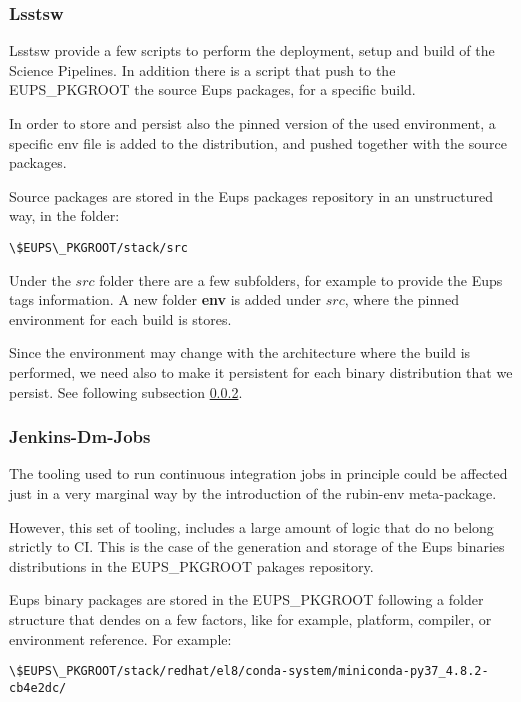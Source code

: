 \documentclass[DM,authoryear,toc]{lsstdoc}
\begin{document}
\subsubsection{Lsstsw} \label{sec:lsstsw}

Lsstsw provide a few scripts to perform the deployment, setup and build of the Science Pipelines.
In addition there is a script that push to the EUPS\_PKGROOT the source Eups packages, for a specific build.

In order to store and persist also the pinned version of the used environment, a specific env file is added to the distribution, 
and pushed together with the source packages.

Source packages are stored in the Eups packages repository in an unstructured way, in the folder:

\begin{verbatim}
\$EUPS\_PKGROOT/stack/src
\end{verbatim}

Under the $src$ folder there are a few subfolders, for example to provide the Eups tags information.
A new folder \textbf{env} is added under $src$, where the pinned environment for each build is stores.

Since the environment may change with the architecture where the build is performed, we need also to make it persistent for each
binary distribution that we persist. See following subsection \ref{sec:jenkins-dm-jobs}.


\subsubsection{Jenkins-Dm-Jobs} \label{sec:jenkins-dm-jobs}

The tooling used to run continuous integration jobs in principle could be affected just in a very marginal way
by the introduction of the rubin-env meta-package.

However, this set of tooling, includes a large amount of logic that do no belong strictly to CI.
This is the case of the generation and storage of the Eups binaries distributions in the EUPS\_PKGROOT pakages repository.

Eups binary packages are stored in the EUPS\_PKGROOT following a folder structure that dendes on a few factors,
like for example, platform, compiler, or environment reference. For example:

\begin{verbatim}
\$EUPS\_PKGROOT/stack/redhat/el8/conda-system/miniconda-py37_4.8.2-cb4e2dc/
\end{verbatim}
\end{document}
